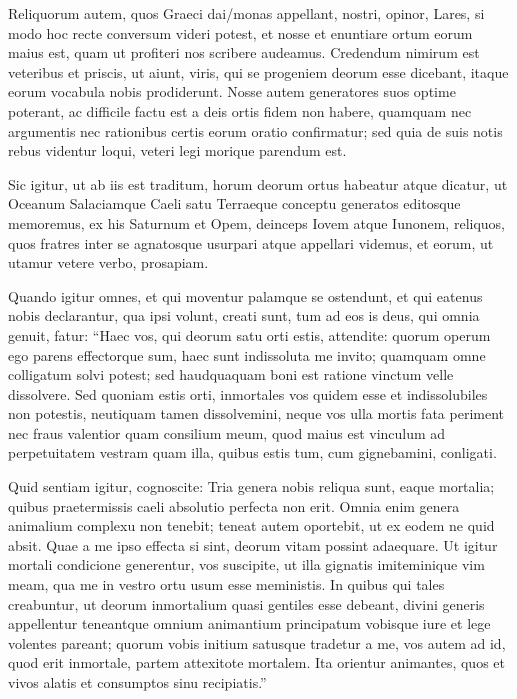  Reliquorum autem, quos Graeci dai/monas appellant, nostri, opinor, Lares, si modo hoc recte conversum videri potest, et nosse et enuntiare ortum eorum maius est, quam ut profiteri nos scribere audeamus. Credendum nimirum est veteribus et priscis, ut aiunt, viris, qui se progeniem deorum esse dicebant, itaque eorum vocabula nobis prodiderunt. Nosse autem generatores suos optime poterant, ac difficile factu est a deis ortis fidem non habere, quamquam nec argumentis nec rationibus certis eorum oratio confirmatur; sed quia de suis notis rebus videntur loqui, veteri legi morique parendum est.

 Sic igitur, ut ab iis est traditum, horum deorum ortus habeatur atque dicatur, ut Oceanum Salaciamque Caeli satu Terraeque conceptu generatos editosque memoremus, ex his Saturnum et Opem, deinceps Iovem atque Iunonem, reliquos, quos fratres inter se agnatosque usurpari atque appellari videmus, et eorum, ut utamur vetere verbo, prosapiam.

 Quando igitur omnes, et qui moventur palamque se ostendunt, et qui eatenus nobis declarantur, qua ipsi volunt, creati sunt, tum ad eos is deus, qui omnia genuit, fatur: ``Haec vos, qui deorum satu orti estis, attendite: quorum operum ego parens effectorque sum, haec sunt indissoluta me invito; quamquam omne colligatum solvi potest; sed haudquaquam boni est ratione vinctum velle dissolvere. Sed quoniam estis orti, inmortales vos quidem esse et indissolubiles non potestis, neutiquam tamen dissolvemini, neque vos ulla mortis fata periment nec fraus valentior quam consilium meum, quod maius est vinculum ad perpetuitatem vestram quam illa, quibus estis tum, cum gignebamini, conligati.

 Quid sentiam igitur, cognoscite: Tria genera nobis reliqua sunt, eaque mortalia; quibus praetermissis caeli absolutio perfecta non erit. Omnia enim genera animalium complexu non tenebit; teneat autem oportebit, ut ex eodem ne quid absit. Quae a me ipso effecta si sint, deorum vitam possint adaequare. Ut igitur mortali condicione generentur, vos suscipite, ut illa gignatis imiteminique vim meam, qua me in vestro ortu usum esse meministis. In quibus qui tales creabuntur, ut deorum inmortalium quasi gentiles esse debeant, divini generis appellentur teneantque omnium animantium principatum vobisque iure et lege volentes pareant; quorum vobis initium satusque tradetur a me, vos autem ad id, quod erit inmortale, partem attexitote mortalem. Ita orientur animantes, quos et vivos alatis et consumptos sinu recipiatis.''

